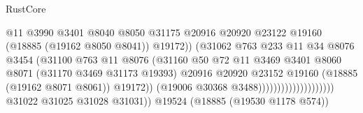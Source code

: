 \begin{lexlean}{RustCore}
\begin{coremodule}
                                                      @11
                                                      @3990
                                                      @3401
                                                      @8040
                                                      @8050
                                                      @31175
                                                      @20916
                                                      @20920
                                                      @23122
                                                      @19160
                                                      (@18885 (@19162 @8050 @8041))
                                                      @19172))
                                                  (@31062
                                                    @763
                                                    @233
                                                    @11
                                                    @34
                                                    @8076
                                                    @3454
                                                    (@31100
                                                      @763
                                                      @11
                                                      @8076
                                                      (@31160
                                                        @50
                                                        @72
                                                        @11
                                                        @3469
                                                        @3401
                                                        @8060
                                                        @8071
                                                        (@31170 @3469 @31173 @19393)
                                                        @20916
                                                        @20920
                                                        @23152
                                                        @19160
                                                        (@18885 (@19162 @8071 @8061))
                                                        @19172))
                                                    (@19006 @30368 @3488))))))))))))))))))))
              @31022
              @31025
              @31028
              @31031))
          @19524
          (@18885 (@19530 @1178 @574))

\end{coremodule}
\end{lexlean}
